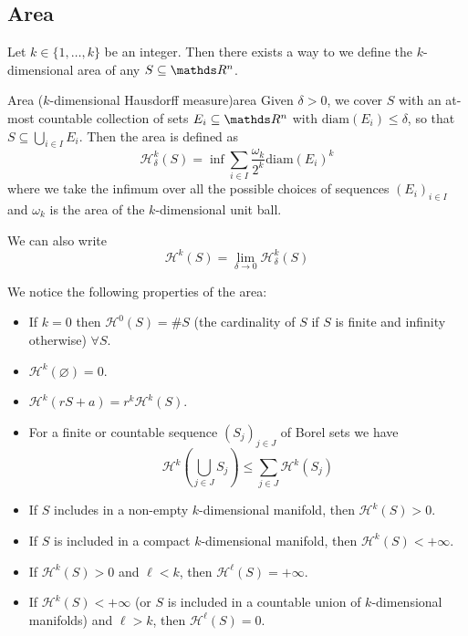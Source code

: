 \documentclass[12pt]{extarticle}
\begin{document}
\subsection{Area}

Let $k \in \{1, \dots, k\}$ be an integer.
Then there exists a  way to we define the $k$-dimensional area of any $S \subseteq \R^n$.

\begin{definition}{Area ($k$-dimensional Hausdorff measure)}{area}
	Given $\delta > 0$, we cover $S$ with an at-most countable collection of sets $E_i \subseteq \R^n$
	with $\mathrm{diam}(E_i) \leq \delta$, so that $S \subseteq \bigcup_{i \in I} E_i$.
	Then the area is defined as
	\begin{equation}
		\mathcal H_\delta^k (S) = \inf \sum_{i \in I} \frac{\omega_k}{2^k} \mathrm{diam}(E_i)^k
	\end{equation}
	where we take the infimum over all the possible choices of sequences $(E_i)_{i \in I}$ and
	$\omega_k$ is the area of the $k$-dimensional unit ball.

	We can also write
	\begin{equation}
		\mathcal H^k (S) = \lim_{\delta \to 0} \mathcal H_\delta^k(S)
	\end{equation}
\end{definition}

We notice the following properties of the area:
\begin{itemize}
	\item If $k = 0$ then $\mathcal H^0(S) = \# S$ (the cardinality of $S$ if $S$ is finite and
	      infinity otherwise) $\forall S$.

	\item $\mathcal H^k (\varnothing) = 0$.

	\item $\mathcal H^k(rS + a) = r^k \mathcal H^k (S)$.

	\item For a finite or countable sequence $(S_j)_{j \in J}$ of Borel sets we have
	      \begin{equation}
		      \mathcal H^k\left(\bigcup_{j \in J} S_j\right) \leq \sum_{j \in J} \mathcal H^k (S_j)
	      \end{equation}

	\item If $S$ includes in a non-empty $k$-dimensional manifold, then $\mathcal H^k(S) > 0$.
	\item If $S$ is included in a compact $k$-dimensional manifold, then $\mathcal H^k(S) < +\infty$.

	\item If $\mathcal H^k(S) >0$ and $\ell < k$, then $\mathcal H^\ell(S) = + \infty$.
	\item If $\mathcal H^k (S) < +\infty$ (or $S$ is included in a countable union of $k$-dimensional
	      manifolds) and $\ell > k$, then $\mathcal H^\ell (S) = 0$.
\end{itemize}
\end{document}
